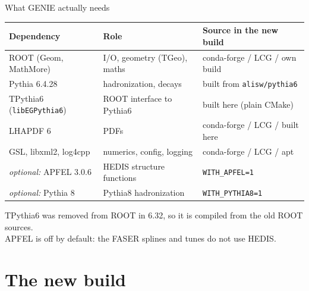 \documentclass[10pt,aspectratio=169]{beamer}
\newcommand{\code}[1]{\texttt{\small #1}}
\begin{document}
\begin{frame}{What GENIE actually needs}
  \centering
  \begin{tabular}{@{}lll@{}}
    \toprule
    Dependency & Role & Source in the new build \\
    \midrule
    ROOT (Geom, MathMore) & I/O, geometry (TGeo), maths & conda-forge / LCG / own build \\
    Pythia 6.4.28 & hadronization, decays & built from \code{alisw/pythia6} \\
    TPythia6 (\code{libEGPythia6}) & ROOT interface to Pythia6 & built here (plain CMake) \\
    LHAPDF 6 & PDFs & conda-forge / LCG / built here \\
    GSL, libxml2, log4cpp & numerics, config, logging & conda-forge / LCG / apt \\
    \midrule
    \emph{optional:} APFEL 3.0.6 & HEDIS structure functions & \code{WITH\_APFEL=1} \\
    \emph{optional:} Pythia 8 & Pythia8 hadronization & \code{WITH\_PYTHIA8=1} \\
    \bottomrule
  \end{tabular}
  \vspace{1em}

  \small TPythia6 was removed from ROOT in 6.32, so it is compiled from the old ROOT sources.\\
  APFEL is off by default: the FASER splines and tunes do not use HEDIS.
\end{frame}

\section{The new build}
\end{document}
